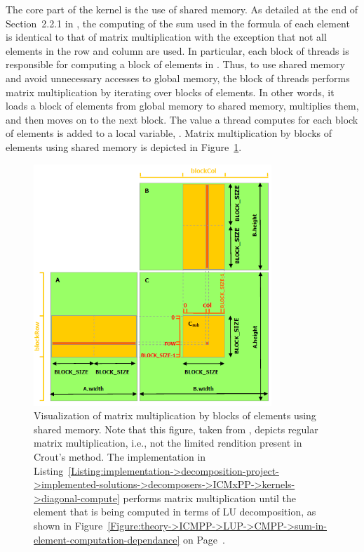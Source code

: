 The core part of the kernel is the use of shared memory.
As detailed at the end of Section~2.2.1 in  \cite{Cejka2022}, the computing of the sum used in the formula of each element is identical to that of matrix multiplication with the exception that not all elements in the row and column are used.
In particular, each block of threads is responsible for computing a block of elements in .
Thus, to use shared memory and avoid unnecessary accesses to global memory, the block of threads performs matrix multiplication by iterating over blocks of elements.
In other words, it loads a block of elements from global memory to shared memory, multiplies them, and then moves on to the next block.
The value a thread computes for each block of elements is added to a local variable, .
Matrix multiplication by blocks of elements using shared memory is depicted in Figure~\ref{Figure:implementation->decomposition-project->implemented-solutions->decomposers->ICMxPP->CUDA-matrix-multiplication-with-shared-memory}.

\begin{figure}[ht!]
	\centering
	\includegraphics[width=0.8\textwidth, keepaspectratio]{images/ch02/CUDA-matrix-multiplication-by-blocks-using-shared-memory.png}
	\caption{Visualization of matrix multiplication by blocks of elements using shared memory.
		Note that this figure, taken from  \cite{NVIDIADecember2022}, depicts regular matrix multiplication, i.e., not the limited rendition present in Crout's method.
		The implementation in Listing~\ref{Listing:implementation->decomposition-project->implemented-solutions->decomposers->ICMxPP->kernels->diagonal-compute} performs matrix multiplication until the element that is being computed in terms of LU decomposition, as shown in Figure~\ref{Figure:theory->ICMPP->LUP->CMPP->sum-in-element-computation-dependance} on Page~\pageref{Figure:theory->ICMPP->LUP->CMPP->sum-in-element-computation-dependance}.
	}
	\label{Figure:implementation->decomposition-project->implemented-solutions->decomposers->ICMxPP->CUDA-matrix-multiplication-with-shared-memory}
\end{figure}

